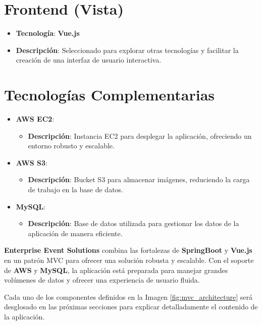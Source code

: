 \section*{Frontend (Vista)}

\begin{itemize}
    \item \textbf{Tecnología}: \textbf{Vue.js}
    \item \textbf{Descripción}: Seleccionado para explorar otras tecnologías y facilitar la creación de una interfaz de usuario interactiva.
\end{itemize}

\section*{Tecnologías Complementarias}

\begin{itemize}
    \item \textbf{AWS EC2}: 
    \begin{itemize}
        \item \textbf{Descripción}: Instancia EC2 para desplegar la aplicación, ofreciendo un entorno robusto y escalable.
    \end{itemize}
    \item \textbf{AWS S3}:
    \begin{itemize}
        \item \textbf{Descripción}: Bucket S3 para almacenar imágenes, reduciendo la carga de trabajo en la base de datos.
    \end{itemize}
    \item \textbf{MySQL}:
    \begin{itemize}
        \item \textbf{Descripción}: Base de datos utilizada para gestionar los datos de la aplicación de manera eficiente.
    \end{itemize}
\end{itemize}

\textbf{Enterprise Event Solutions} combina las fortalezas de \textbf{SpringBoot} y \textbf{Vue.js} en un patrón MVC para ofrecer una solución robusta y 
escalable. Con el soporte de \textbf{AWS} y \textbf{MySQL}, la aplicación está preparada para manejar grandes volúmenes de datos y ofrecer una experiencia 
de usuario fluida.


Cada uno de los componentes definidos en la Imagen \ref{fig:mvc_architecture} será desglosado en las próximas secciones para explicar detalladamente el contenido de 
la aplicación.

